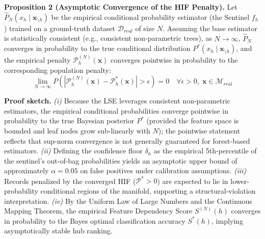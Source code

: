 \textbf{Proposition 2 (Asymptotic Convergence of the HIF Penalty).} Let $\hat{P}_N(x_h \mid \mathbf{x}_{\setminus h})$ be the empirical conditional probability estimator (the Sentinel $f_h$) trained on a ground-truth dataset $\mathcal{D}_{real}$ of size $N$. Assuming the base estimator is statistically consistent (e.g., consistent non-parametric trees), as $N \to \infty$, $\hat{P}_N$ converges in probability to the true conditional distribution $P^*(x_h \mid \mathbf{x}_{\setminus h})$, and the empirical penalty $\mathcal{P}_h^{(N)}(\mathbf{x})$ converges pointwise in probability to the corresponding population penalty:
\begin{equation}
    \lim_{N \to \infty} P\left( \left| \mathcal{P}_h^{(N)}(\mathbf{x}) - \mathcal{P}_h^*(\mathbf{x}) \right| > \epsilon \right) = 0 \quad \forall \epsilon > 0, \; \mathbf{x} \in \mathcal{M}_{real}
\end{equation}

\textbf{Proof sketch.} \emph{(i)} Because the LSE leverages consistent non-parametric estimators, the empirical conditional probabilities converge pointwise in probability to the true Bayesian posterior $P^*$ (provided the feature space is bounded and leaf nodes grow sub-linearly with $N$); the pointwise statement reflects that sup-norm convergence is not generally guaranteed for forest-based estimators. \emph{(ii)} Defining the confidence floor $\delta_h$ as the empirical 5th-percentile of the sentinel's out-of-bag probabilities yields an asymptotic upper bound of approximately $\alpha = 0.05$ on false positives under calibration assumptions. \emph{(iii)} Records penalized by the converged HIF ($\mathcal{P}^* > 0$) are expected to lie in lower-probability conditional regions of the manifold, supporting a structural-violation interpretation. \emph{(iv)} By the Uniform Law of Large Numbers and the Continuous Mapping Theorem, the empirical Feature Dependency Score $S^{(N)}(h)$ converges in probability to the Bayes optimal classification accuracy $S^*(h)$, implying asymptotically stable hub ranking.

